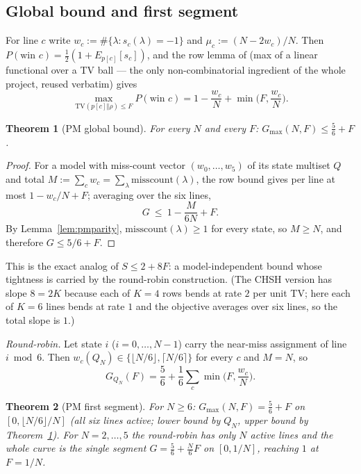 \documentclass[aps,pra,reprint,superscriptaddress,floatfix]{revtex4-2}
\newcommand{\TV}{\mathrm{TV}}
\newtheorem{theorem}{Theorem}
\begin{document}
\subsection{Global bound and first segment}

For line $c$ write $w_{c}:=\#\{\lambda:s_{c}(\lambda)=-1\}$ and
$\mu_{c}:=(N-2w_{c})/N$. Then $P(\text{win }c)=\tfrac12(1+E_{p[c]}
[s_{c}])$, and the row lemma of \cite{mainpaper2026} (max of a linear
functional over a TV ball --- the only non-combinatorial ingredient of the
whole project, reused verbatim) gives
\begin{equation*}
\max_{\TV(p[c]\Vert\rho)\le F}P(\text{win }c)
=1-\frac{w_{c}}{N}+\min\Big(F,\frac{w_{c}}{N}\Big).
\end{equation*}

\begin{theorem}[PM global bound]
\label{thm:pm2}
For every $N$ and every $F$: $G_{\max}(N,F)\le \tfrac56+F$.
\end{theorem}

\begin{proof}
For a model with miss-count vector $(w_{0},\dots,w_{5})$ of its state
multiset $Q$ and total $M:=\sum_{c}w_{c}=\sum_{\lambda}\mathrm{misscount}
(\lambda)$, the row bound gives per line at most $1-w_{c}/N+F$;
averaging over the six lines,
\begin{equation*}
G\ \le\ 1-\frac{M}{6N}+F.
\end{equation*}
By Lemma~\ref{lem:pmparity}, $\mathrm{misscount}(\lambda)\ge 1$ for every
state, so $M\ge N$, and therefore $G\le 5/6+F$.
\end{proof}

This is the exact analog of $S\le 2+8F$: a model-independent bound whose
tightness is carried by the round-robin construction. (The {CHSH} version
has slope $8=2K$ because each of $K=4$ rows bends at rate $2$ per unit TV;
here each of $K=6$ lines bends at rate $1$ and the objective averages over
six lines, so the total slope is $1$.)

\emph{Round-robin.} Let state $i$ ($i=0,\dots,N-1$) carry the near-miss
assignment of line $i\bmod 6$. Then $w_{c}(Q_{N})\in\{\lfloor N/6\rfloor,\lceil N/6\rceil\}$ for every $c$ and $M=N$, so
\begin{equation*}
G_{Q_{N}}(F)=\frac56+\frac16\sum_{c}\min\Big(F,\frac{w_{c}}{N}\Big).
\end{equation*}

\begin{theorem}[PM first segment]
\label{thm:pm3}
For $N\ge 6$: $G_{\max}(N,F)=\tfrac56+F$ on
$[0,\lfloor N/6\rfloor/N]$ (all six lines active; lower bound by
$Q_{N}$, upper bound by Theorem~\ref{thm:pm2}). For $N=2,\dots,5$ the
round-robin has only $N$ active lines and the whole curve is the single
segment $G=\tfrac56+\tfrac{N}{6}F$ on $[0,1/N]$, reaching $1$ at $F=1/N$.
\end{theorem}
\end{document}
